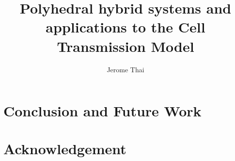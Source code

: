 \documentclass[letterpaper, 10 pt, conference]{ieeeconf}
\numberwithin{equation}{section}
\numberwithin{figure}{section}
\numberwithin{table}{section}
\begin{document}
\author{Jerome Thai}%
\title{Polyhedral hybrid systems and applications to the Cell Transmission Model}

\maketitle

\thispagestyle{empty}
\pagestyle{empty}









\section{Conclusion and Future Work}

\section{Acknowledgement}





\end{document}
